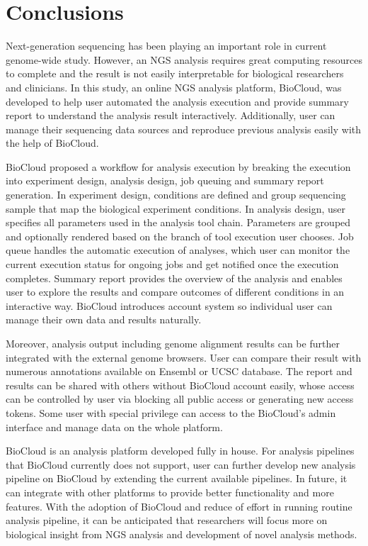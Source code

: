 \chapter{Conclusions}
\label{c:conclusion}

Next-generation sequencing has been playing an important role in current
genome-wide study. However, an NGS analysis requires great computing resources
to complete and the result is not easily interpretable for biological
researchers and clinicians. In this study, an online NGS analysis platform,
BioCloud, was developed to help user automated the analysis execution and
provide summary report to understand the analysis result interactively.
Additionally, user can manage their sequencing data sources and reproduce
previous analysis easily with the help of BioCloud.

BioCloud proposed a workflow for analysis execution by breaking the execution
into experiment design, analysis design, job queuing and summary report
generation. In experiment design, conditions are defined and group sequencing
sample that map the biological experiment conditions. In analysis design, user
specifies all parameters used in the analysis tool chain. Parameters are
grouped and optionally rendered based on the branch of tool execution user
chooses. Job queue handles the automatic execution of analyses, which user can
monitor the current execution status for ongoing jobs and get notified once the
execution completes. Summary report provides the overview of the analysis and
enables user to explore the results and compare outcomes of different
conditions in an interactive way. BioCloud introduces account system so
individual user can manage their own data and results naturally.

Moreover, analysis output including genome alignment results can be further
integrated with the external genome browsers. User can compare their result
with numerous annotations available on Ensembl or UCSC database. The report and
results can be shared with others without BioCloud account easily, whose access
can be controlled by user via blocking all public access or generating new
access tokens. Some user with special privilege can access to the BioCloud's
admin interface and manage data on the whole platform.

BioCloud is an analysis platform developed fully in house. For analysis
pipelines that BioCloud currently does not support, user can further develop
new analysis pipeline on BioCloud by extending the current available pipelines.
In future, it can integrate with other platforms to provide better
functionality and more features. With the adoption of BioCloud and reduce of
effort in running routine analysis pipeline, it can be anticipated that
researchers will focus more on biological insight from NGS analysis and
development of novel analysis methods.



